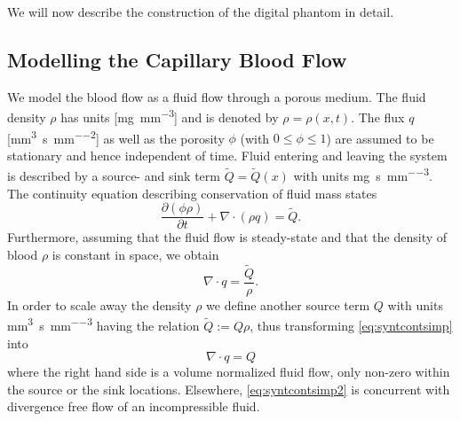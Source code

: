\documentclass[paper=a4, fontsize=11pt,parskip=half,headings=small]{scrartcl}
\newcommand{\siQmm}{\milli\meter\cubed\per\second\per\milli\meter\cubed}
\newcommand{\siq}{\milli\meter\cubed\per\second\per\milli\meter\squared}
\newcommand{\sirho}{\milli\gram\per\milli\meter\cubed}
\newcommand{\siQtilde}{\milli\gram\per\second\per\milli\meter\cubed}
\begin{document}
	We will now describe the construction of the digital phantom in detail.	
	
	\subsection{Modelling the Capillary Blood Flow}\label{sec:flow}
	
	We model the blood flow as a fluid flow through a porous medium. 
	The fluid density $\rho$ has units [\si{\sirho}] and is denoted by $\rho = \rho(x,t)$.
	The flux $q$ [\si{\siq}] as well as the porosity $\phi$ (with $0 \le \phi \le 1$) are assumed to be stationary and hence independent of time.
	Fluid entering and leaving the system is described by a source- and sink term $\tilde{Q} = \tilde{Q}(x)$ with units \si{\siQtilde}. 
	The continuity equation describing conservation of fluid mass states
	\begin{equation}
		\frac{\partial (\phi \rho)}{\partial t} + \nabla \cdot (\rho q) = \tilde{Q}.
		\label{eq:syntcont}
	\end{equation} 
	Furthermore, assuming that the fluid flow is steady-state and that the density of blood $\rho$ is constant in space, we obtain
	\begin{equation}
		\nabla \cdot q = \frac{\tilde{Q}}{\rho}.
		\label{eq:syntcontsimp}
	\end{equation}
	In order to scale away the density $\rho$ we define another source term $Q$ with units \si{\siQmm} having the relation $\tilde{Q} := Q\rho$, thus transforming \eqref{eq:syntcontsimp} into
	\begin{equation}
		\nabla \cdot q = Q
		\label{eq:syntcontsimp2}
	\end{equation}
	where the right hand side is a volume normalized fluid flow, only non-zero within the source or the sink locations. 
	Elsewhere, \eqref{eq:syntcontsimp2} is concurrent with divergence free flow of an incompressible fluid.
	
\end{document}
